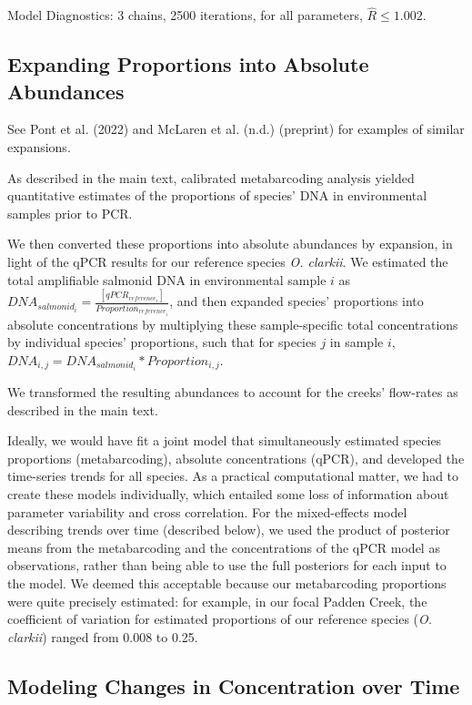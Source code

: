 \documentclass[
]{article}
\begin{document}
Model Diagnostics: 3 chains, 2500 iterations, for all parameters,
\(\hat{R} \leq 1.002\).

\hypertarget{expanding-proportions-into-absolute-abundances}{%
\subsection{Expanding Proportions into Absolute
Abundances}\label{expanding-proportions-into-absolute-abundances}}

See Pont et al. (2022) and McLaren et al. (n.d.) (preprint) for examples
of similar expansions.

As described in the main text, calibrated metabarcoding analysis yielded
quantitative estimates of the proportions of species' DNA in
environmental samples prior to PCR.

We then converted these proportions into absolute abundances by
expansion, in light of the qPCR results for our reference species
\emph{O. clarkii}. We estimated the total amplifiable salmonid DNA in
environmental sample \(i\) as
\(DNA_{salmonid_{i}} = \frac{[qPCR_{reference_{i}}]}{Proportion_{reference_{i}}}\),
and then expanded species' proportions into absolute concentrations by
multiplying these sample-specific total concentrations by individual
species' proportions, such that for species \(j\) in sample \(i\),
\(DNA_{i,j} = DNA_{salmonid_{i}} * Proportion_{i,j}\).

We transformed the resulting abundances to account for the creeks'
flow-rates as described in the main text.

Ideally, we would have fit a joint model that simultaneously estimated
species proportions (metabarcoding), absolute concentrations (qPCR), and
developed the time-series trends for all species. As a practical
computational matter, we had to create these models individually, which
entailed some loss of information about parameter variability and cross
correlation. For the mixed-effects model describing trends over time
(described below), we used the product of posterior means from the
metabarcoding and the concentrations of the qPCR model as observations,
rather than being able to use the full posteriors for each input to the
model. We deemed this acceptable because our metabarcoding proportions
were quite precisely estimated: for example, in our focal Padden Creek,
the coefficient of variation for estimated proportions of our reference
species (\emph{O. clarkii}) ranged from 0.008 to 0.25.

\hypertarget{modeling-changes-in-concentration-over-time}{%
\subsection{Modeling Changes in Concentration over
Time}\label{modeling-changes-in-concentration-over-time}}
\end{document}
